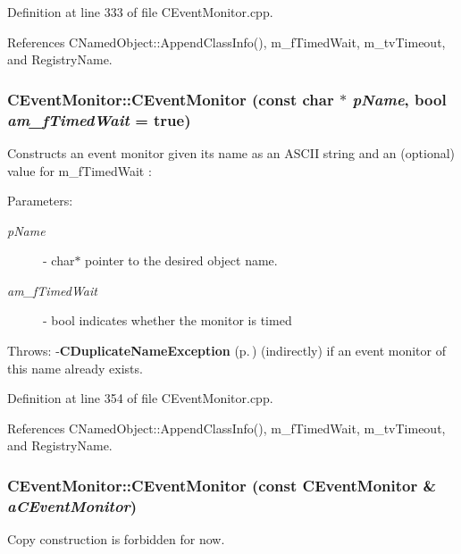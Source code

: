 Definition at line 333 of file CEvent\-Monitor.cpp.

References CNamed\-Object::Append\-Class\-Info(), m\_\-f\-Timed\-Wait, m\_\-tv\-Timeout, and Registry\-Name.
\subsubsection{\setlength{\rightskip}{0pt plus 5cm}CEvent\-Monitor::CEvent\-Monitor (const char $\ast$ {\em p\-Name}, bool {\em am\_\-f\-Timed\-Wait} = true)}\label{classCEventMonitor_a2}


Constructs an event monitor given its name as an ASCII string and an (optional) value for m\_\-f\-Timed\-Wait :\begin{Desc}
\item[Parameters: ]\par
\begin{description}
\item[{\em 
p\-Name}]- char$\ast$ pointer to the desired object name. \item[{\em 
am\_\-f\-Timed\-Wait}]- bool indicates whether the monitor is timed\end{description}
\end{Desc}
Throws: -{\bf CDuplicate\-Name\-Exception} {\rm (p.\,\pageref{classCDuplicateNameException})} (indirectly) if an event monitor of this name already exists. 

Definition at line 354 of file CEvent\-Monitor.cpp.

References CNamed\-Object::Append\-Class\-Info(), m\_\-f\-Timed\-Wait, m\_\-tv\-Timeout, and Registry\-Name.
\subsubsection{\setlength{\rightskip}{0pt plus 5cm}CEvent\-Monitor::CEvent\-Monitor (const CEvent\-Monitor \& {\em a\-CEvent\-Monitor})\hspace{0.3cm}{\tt  [private]}}\label{classCEventMonitor_c0}


Copy construction is forbidden for now.

